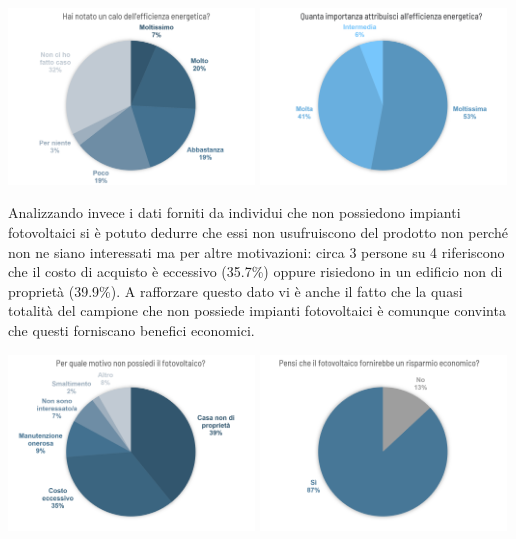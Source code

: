 \documentclass[a4paper, 12pt]{article}
\begin{document}
	\begin{center}
		\includegraphics[width=0.49\textwidth]{Images/effetti_efficienza.png}
		\includegraphics[width=0.49\textwidth]{Images/importanza_efficienza.png}
	\end{center}
	Analizzando invece i dati forniti da individui che non possiedono impianti fotovoltaici si è potuto dedurre che essi non usufruiscono del prodotto non perché non ne siano interessati ma per altre motivazioni: circa 3 persone su 4 riferiscono che il costo di acquisto è eccessivo (35.7\%) oppure risiedono in un edificio non di proprietà (39.9\%). A rafforzare questo dato vi è anche il fatto che la quasi totalità del campione che non possiede impianti fotovoltaici è comunque convinta che questi forniscano benefici economici.
	\begin{center}
		\includegraphics[width=0.49\textwidth]{Images/no_pannelli.png}
		\includegraphics[width=0.49\textwidth]{Images/vantaggi_pannelli.png}
	\end{center}
\end{document}
